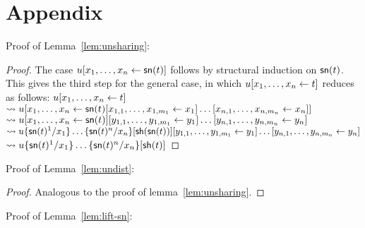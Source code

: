 \documentclass{llncs} %
\begin{document}



\newpage

\section*{Appendix}



Proof of Lemma~\ref{lem:unsharing}:

\begin{proof}
The case $u\share x{\sn(t)}$ follows by structural induction on ${\mathsf{sn}}(t)$.
%
This gives the third step for the general case, in which
$u\share xt$ reduces as follows: $u\share xt$
\\ $ \rewrite u\share x{\sn(t)\share*{x_{1,1},\dots,x_{1,m_1}}{x_1}\dots\share*{x_{n,1},\dots,x_{n,m_n}}{x_n}}$
\\ $ \rewrite u\share x{\sn(t)}\share*{y_{1,1},\dots,y_{1,m_1}}{y_1}\dots\share*{y_{n,1},\dots,y_{n,m_n}}{y_n}$
\\ $ \rewrite u\sub{x_1}{\sn(t)^1}\dots\sub{x_n}{\sn(t)^n}[\sh(\sn(t))]\share*{y_{1,1},\dots,y_{1,m_1}}{y_1}\dots\share*{y_{n,1},\dots,y_{n,m_n}}{y_n}$
\\ $\rewrite u\sub{x_1}{\sn(t)^1}\dots\sub{x_n}{\sn(t)^n}[\sh(t)]$
\end{proof}

Proof of Lemma~\ref{lem:undist}:

\begin{proof}
Analogous to the proof of lemma~\ref{lem:unsharing}.
\end{proof}

Proof of Lemma~\ref{lem:lift-sn}:
\end{document}
